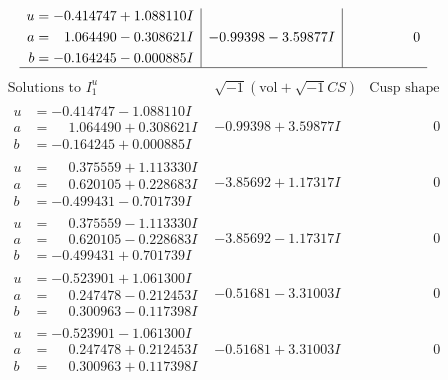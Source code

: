 \documentclass[1p]{elsarticle_modified}
\theoremstyle{definition}
\newcommand{\I}{\sqrt{-1}}
\begin{document}
$$\begin{array}{c|c|c}
\begin{aligned}
u &= -0.414747 + 1.088110 I \\
a &= \phantom{-}1.064490 - 0.308621 I \\
b &= -0.164245 - 0.000885 I\end{aligned}
 & -0.99398 - 3.59877 I & \phantom{-0.000000 } 0\\
 \hline 
 \end{array}$$\newpage$$\begin{array}{c|c|c}  
\text{Solutions to }I^u_{1}& \I (\text{vol} + \sqrt{-1}CS) & \text{Cusp shape}\\
 \hline 
\begin{aligned}
u &= -0.414747 - 1.088110 I \\
a &= \phantom{-}1.064490 + 0.308621 I \\
b &= -0.164245 + 0.000885 I\end{aligned}
 & -0.99398 + 3.59877 I & \phantom{-0.000000 } 0 \\ \hline\begin{aligned}
u &= \phantom{-}0.375559 + 1.113330 I \\
a &= \phantom{-}0.620105 + 0.228683 I \\
b &= -0.499431 - 0.701739 I\end{aligned}
 & -3.85692 + 1.17317 I & \phantom{-0.000000 } 0 \\ \hline\begin{aligned}
u &= \phantom{-}0.375559 - 1.113330 I \\
a &= \phantom{-}0.620105 - 0.228683 I \\
b &= -0.499431 + 0.701739 I\end{aligned}
 & -3.85692 - 1.17317 I & \phantom{-0.000000 } 0 \\ \hline\begin{aligned}
u &= -0.523901 + 1.061300 I \\
a &= \phantom{-}0.247478 - 0.212453 I \\
b &= \phantom{-}0.300963 - 0.117398 I\end{aligned}
 & -0.51681 - 3.31003 I & \phantom{-0.000000 } 0 \\ \hline\begin{aligned}
u &= -0.523901 - 1.061300 I \\
a &= \phantom{-}0.247478 + 0.212453 I \\
b &= \phantom{-}0.300963 + 0.117398 I\end{aligned}
 & -0.51681 + 3.31003 I & \phantom{-0.000000 } 0 \\ \hline\begin{aligned}

\end{aligned}
\end{array}$$
\end{document}
